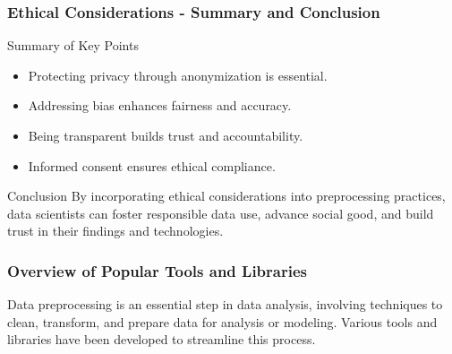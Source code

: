 \documentclass{beamer}
\begin{document}
\begin{frame}[fragile]
    \frametitle{Ethical Considerations - Summary and Conclusion}
    \begin{block}{Summary of Key Points}
        \begin{itemize}
            \item Protecting privacy through anonymization is essential.
            \item Addressing bias enhances fairness and accuracy.
            \item Being transparent builds trust and accountability.
            \item Informed consent ensures ethical compliance.
        \end{itemize}
    \end{block}
    
    \begin{block}{Conclusion}
        By incorporating ethical considerations into preprocessing practices, data scientists can foster responsible data use, advance social good, and build trust in their findings and technologies.
    \end{block}
\end{frame}

\begin{frame}
    \frametitle{Overview of Popular Tools and Libraries}
    Data preprocessing is an essential step in data analysis, involving techniques to clean, transform, and prepare data for analysis or modeling. Various tools and libraries have been developed to streamline this process.
\end{frame}
\end{document}
